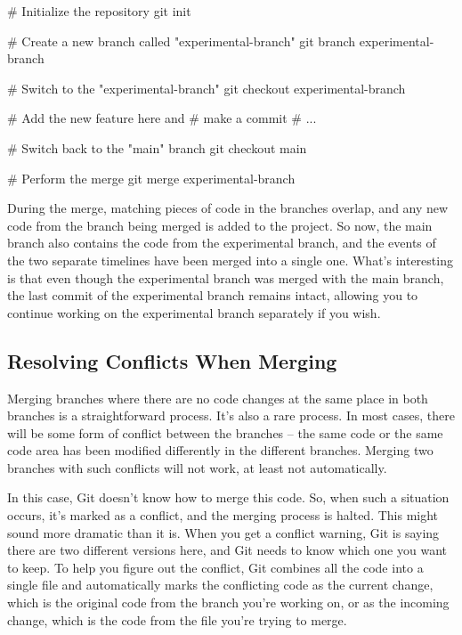 \documentclass[
  letterpaper,
  DIV=11,
  numbers=noendperiod]{scrreprt}
\newenvironment{Shaded}{\begin{snugshade}}{\end{snugshade}}
\newcommand{\CommentTok}[1]{\textcolor[rgb]{0.37,0.37,0.37}{#1}}
\newcommand{\FunctionTok}[1]{\textcolor[rgb]{0.28,0.35,0.67}{#1}}
\newcommand{\NormalTok}[1]{\textcolor[rgb]{0.00,0.23,0.31}{#1}}
\begin{document}
\begin{Shaded}
\begin{Highlighting}[]
\CommentTok{\# Initialize the repository}
\FunctionTok{git}\NormalTok{ init}

\CommentTok{\# Create a new branch called "experimental{-}branch"}
\FunctionTok{git}\NormalTok{ branch experimental{-}branch}

\CommentTok{\# Switch to the "experimental{-}branch"}
\FunctionTok{git}\NormalTok{ checkout experimental{-}branch}

\CommentTok{\# Add the new feature here and}
\CommentTok{\# make a commit}
\CommentTok{\# ...}

\CommentTok{\# Switch back to the "main" branch}
\FunctionTok{git}\NormalTok{ checkout main}

\CommentTok{\# Perform the merge}
\FunctionTok{git}\NormalTok{ merge experimental{-}branch}
\end{Highlighting}
\end{Shaded}

During the merge, matching pieces of code in the branches overlap, and
any new code from the branch being merged is added to the project. So
now, the main branch also contains the code from the experimental
branch, and the events of the two separate timelines have been merged
into a single one. What's interesting is that even though the
experimental branch was merged with the main branch, the last commit of
the experimental branch remains intact, allowing you to continue working
on the experimental branch separately if you wish.

\subsection{Resolving Conflicts When
Merging}\label{resolving-conflicts-when-merging}

Merging branches where there are no code changes at the same place in
both branches is a straightforward process. It's also a rare process. In
most cases, there will be some form of conflict between the branches --
the same code or the same code area has been modified differently in the
different branches. Merging two branches with such conflicts will not
work, at least not automatically.

In this case, Git doesn't know how to merge this code. So, when such a
situation occurs, it's marked as a conflict, and the merging process is
halted. This might sound more dramatic than it is. When you get a
conflict warning, Git is saying there are two different versions here,
and Git needs to know which one you want to keep. To help you figure out
the conflict, Git combines all the code into a single file and
automatically marks the conflicting code as the current change, which is
the original code from the branch you're working on, or as the incoming
change, which is the code from the file you're trying to merge.
\end{document}
